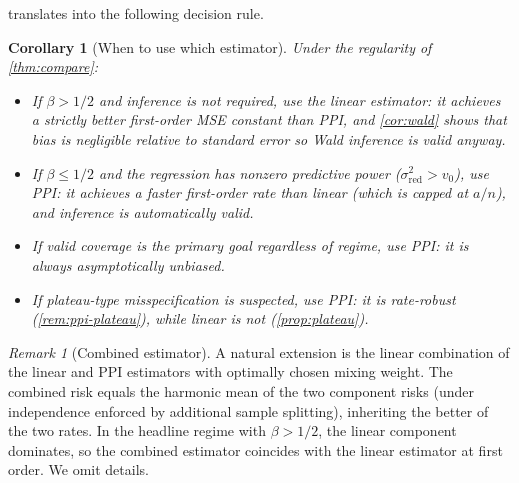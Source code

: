 \documentclass[11pt]{article}
\theoremstyle{plain}
\newtheorem{corollary}[theorem]{Corollary}
\theoremstyle{definition}
\theoremstyle{remark}
\newtheorem{remark}[theorem]{Remark}
\begin{document}
 translates into the following decision rule.

\begin{corollary}[When to use which estimator]\label{cor:decision}
Under the regularity of \cref{thm:compare}:
\begin{itemize}[leftmargin=*]
\item If $\beta>1/2$ and inference is not required, use the linear estimator: it achieves a strictly better first-order MSE constant than PPI, and \cref{cor:wald} shows that bias is negligible relative to standard error so Wald inference is valid anyway.
\item If $\beta\le1/2$ and the regression has nonzero predictive power ($\sigma_{\mathrm{red}}^2>v_0$), use PPI: it achieves a faster first-order rate than linear (which is capped at $a/n$), and inference is automatically valid.
\item If valid coverage is the primary goal regardless of regime, use PPI: it is always asymptotically unbiased.
\item If plateau-type misspecification is suspected, use PPI: it is rate-robust (\cref{rem:ppi-plateau}), while linear is not (\cref{prop:plateau}).
\end{itemize}
\end{corollary}

\begin{remark}[Combined estimator]\label{rem:combined}
A natural extension is the linear combination of the linear and PPI estimators with optimally chosen mixing weight. The combined risk equals the harmonic mean of the two component risks (under independence enforced by additional sample splitting), inheriting the better of the two rates. In the headline regime with $\beta>1/2$, the linear component dominates, so the combined estimator coincides with the linear estimator at first order. We omit details.
\end{remark}
\end{document}
